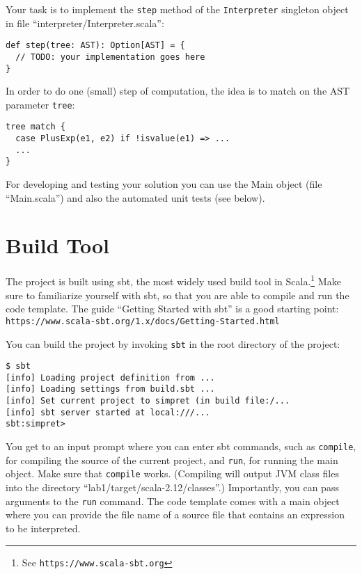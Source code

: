 \documentclass[12pt, a4paper, twoside]{article}
\begin{document}
Your task is to implement the \texttt{step} method of the
 \texttt{Interpreter} singleton object in file
 ``interpreter/Interpreter.scala'':

\begin{verbatim}
def step(tree: AST): Option[AST] = {
  // TODO: your implementation goes here
}
\end{verbatim}

In order to do one (small) step of computation, the idea is to match
on the AST parameter \verb|tree|:

\begin{verbatim}
tree match {
  case PlusExp(e1, e2) if !isvalue(e1) => ...
  ...
}
\end{verbatim}

For developing and testing your solution you can use the Main object
(file ``Main.scala'') and also the automated unit tests (see below).

\section{Build Tool}

The project is built using sbt, the most widely used build tool in
Scala.\footnote{See \texttt{https://www.scala-sbt.org}} Make sure to
familiarize yourself with sbt, so that you are able to compile and run
the code template. The guide ``Getting Started with sbt'' is a good
starting
point:\\ \texttt{https://www.scala-sbt.org/1.x/docs/Getting-Started.html}

You can build the project by invoking \texttt{sbt} in the root
directory of the project:

\begin{verbatim}
$ sbt
[info] Loading project definition from ...
[info] Loading settings from build.sbt ...
[info] Set current project to simpret (in build file:/...
[info] sbt server started at local:///...
sbt:simpret>
\end{verbatim}

You get to an input prompt where you can enter sbt commands, such as
\texttt{compile}, for compiling the source of the current project, and
\texttt{run}, for running the main object. Make sure that
\texttt{compile} works. (Compiling will output JVM class files into
the directory ``lab1/target/scala-2.12/classes''.) Importantly, you
can pass arguments to the \texttt{run} command. The code template
comes with a main object where you can provide the file name of a
source file that contains an expression to be interpreted.
\end{document}
